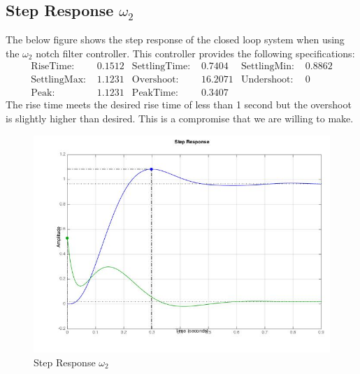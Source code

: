 \documentclass[11pt,titlepage]{article}
\begin{document}
	\subsection{Step Response $\omega_2$}
		The below figure shows the step response of the closed loop system when using the $\omega_2$ notch filter controller. This controller provides the following specifications:
		\begin{align*}
			\mbox{RiseTime: } &0.1512 & \mbox{SettlingTime: } &0.7404 & \mbox{SettlingMin: } &0.8862\\
     		\mbox{SettlingMax: } &1.1231 & \mbox{Overshoot: } &16.2071 & \mbox{Undershoot: } &0\\
     		\mbox{Peak: } &1.1231 & \mbox{PeakTime: } &0.3407 &
        \end{align*}
        The rise time meets the desired rise time of less than 1 second but the overshoot is slightly higher than desired. This is a compromise that we are willing to make.
		\begin{figure}[H]
			\centering
			\includegraphics[scale=0.4]{stepw2}
			\caption{Step Response $\omega_2$}
		\end{figure}
\end{document}
